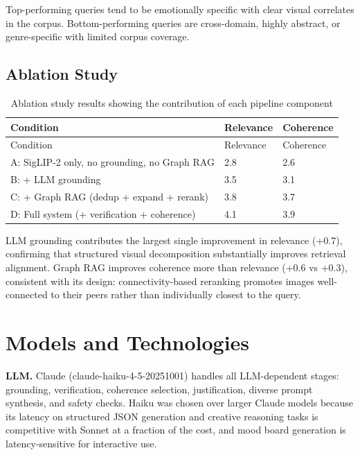 \documentclass[
  11pt,
]{article}
\begin{document}
Top-performing queries tend to be emotionally specific with clear visual
correlates in the corpus. Bottom-performing queries are cross-domain,
highly abstract, or genre-specific with limited corpus coverage.

\subsection{Ablation Study}\label{ablation-study}

\begin{longtable}[]{@{}lll@{}}
\caption{Ablation study results showing the contribution of each
pipeline component}\label{tbl-ablation}\tabularnewline
\toprule\noalign{}
Condition & Relevance & Coherence \\
\midrule\noalign{}
\endfirsthead
\toprule\noalign{}
Condition & Relevance & Coherence \\
\midrule\noalign{}
\endhead
\bottomrule\noalign{}
\endlastfoot
A: SigLIP-2 only, no grounding, no Graph RAG & 2.8 & 2.6 \\
B: + LLM grounding & 3.5 & 3.1 \\
C: + Graph RAG (dedup + expand + rerank) & 3.8 & 3.7 \\
D: Full system (+ verification + coherence) & 4.1 & 3.9 \\
\end{longtable}

LLM grounding contributes the largest single improvement in relevance
(+0.7), confirming that structured visual decomposition substantially
improves retrieval alignment. Graph RAG improves coherence more than
relevance (+0.6 vs +0.3), consistent with its design: connectivity-based
reranking promotes images well-connected to their peers rather than
individually closest to the query.

\section{Models and Technologies}\label{models-and-technologies}

\textbf{LLM.} Claude (claude-haiku-4-5-20251001) handles all
LLM-dependent stages: grounding, verification, coherence selection,
justification, diverse prompt synthesis, and safety checks. Haiku was
chosen over larger Claude models because its latency on structured JSON
generation and creative reasoning tasks is competitive with Sonnet at a
fraction of the cost, and mood board generation is latency-sensitive for
interactive use.
\end{document}
